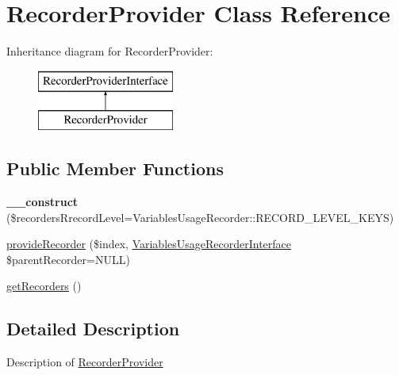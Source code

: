 \hypertarget{class_pes_1_1_view_1_1_recorder_1_1_recorder_provider}{}\section{Recorder\+Provider Class Reference}
\label{class_pes_1_1_view_1_1_recorder_1_1_recorder_provider}
Inheritance diagram for Recorder\+Provider\+:\begin{figure}[H]
\begin{center}
\leavevmode
\includegraphics[height=2.000000cm]{class_pes_1_1_view_1_1_recorder_1_1_recorder_provider}
\end{center}
\end{figure}
\subsection*{Public Member Functions}
\begin{DoxyCompactItemize}
\item 
\mbox{\label{class_pes_1_1_view_1_1_recorder_1_1_recorder_provider_a4176b53a30ad9bd88462ab0ef5b44b71}} 
{\bfseries \+\_\+\+\_\+construct} (\$recorders\+Rrecord\+Level=Variables\+Usage\+Recorder\+::\+R\+E\+C\+O\+R\+D\+\_\+\+L\+E\+V\+E\+L\+\_\+\+K\+E\+YS)
\item 
\mbox{\hyperlink{class_pes_1_1_view_1_1_recorder_1_1_recorder_provider_a3a845b7c3190054b0443ad6d53022756}{provide\+Recorder}} (\$index, \mbox{\hyperlink{interface_pes_1_1_view_1_1_recorder_1_1_variables_usage_recorder_interface}{Variables\+Usage\+Recorder\+Interface}} \$parent\+Recorder=N\+U\+LL)
\item 
\mbox{\hyperlink{class_pes_1_1_view_1_1_recorder_1_1_recorder_provider_ad8b2b29a9520c160fd7b09907bd01e27}{get\+Recorders}} ()
\end{DoxyCompactItemize}


\subsection{Detailed Description}
Description of \mbox{\hyperlink{class_pes_1_1_view_1_1_recorder_1_1_recorder_provider}{Recorder\+Provider}}

